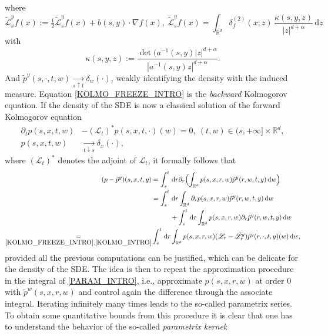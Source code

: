 \documentclass[11pt]{article}
\newcommand{\ie}{i.e.,\xspace}
\numberwithin{equation}{section}\providecommand{\asymp}{\mathrel{\sim}}
\newcommand{\rd}{\mathrm{d}}
\theoremstyle{plain}
\theoremstyle{definition}
\let\p\partial
\newcommand\cL{{\mathcal L}}
\newcommand\mR{\mathbb{R}}
\newcommand\1{{\mathbf{1}}}
\newcommand\sL{{\mathscr L}}
\newcommand{\dif}{\,\mathrm{d}}
\begin{document}
{\begin{equation}
\end{equation}
where
\[
\tilde \sL^{y}_{s} f(x):=\tfrac 12\tilde \cL^{y}_{s} f(x)+b(s, y)\cdot\nabla f(x),\
\tilde \cL^{y}_{s} f(x)=\int_{\mR^d}\delta^{(2)}_f(x;z)\,\frac{\kappa(s,y,z)}{|z|^{d+\alpha}}\,\rd z
\]
with
\[
\kappa(s,y,z):=\frac{\det(a^{-1}(s,y)|z|^{d+\alpha}}{|a^{-1}(s,y)z|^{d+\alpha}}.
\]
And $\tilde p^{y}(s,\cdot,t,w) \underset{s\uparrow t}{\longrightarrow} \delta_w(\cdot)$, weakly identifying the density with the induced measure. Equation \eqref{KOLMO_FREEZE_INTRO} is the \textit{backward} Kolmogorov equation. If the density of the SDE is now a classical solution of the forward Kolmogorov equation
\begin{equation}
\begin{aligned}\label{KOLMO_INTRO}
\p_t p(s,x,t,w)&-({\sL}_t)^*p(s,x,t,\cdot)(w)=0,\ (t,w)\in (s,+\infty]\times \mR^d,\\
p(s,x,t,w) &\underset{t\downarrow s}{\longrightarrow} \delta_x(\cdot),
\end{aligned}
\end{equation}
where $({\sL}_t)^* $ denotes the adjoint of ${\sL}_t $,
it formally follows that
\begin{equation}
\begin{aligned}
(p-\tilde p^y)(s,x,t,y)&=\int_s^t \dif r \partial_r\Bigl(\int_{\mR^d}p(s,x,r,w) \tilde p^y(r,w,t,y) \dif w\Bigr)\\
&=\int_s^t \dif r \int_{\mR^d} \partial_r p(s,x,r,w) \tilde p^y(r,w,t,y) \dif w\\
&\hspace*{1cm}+\int_s^t \dif r \int_{\mR^d} p(s,x,r,w) \partial_r\tilde p^y(r,w,t,y) \dif w\\
\underset{\eqref{KOLMO_FREEZE_INTRO}, \eqref{KOLMO_INTRO}}{=}
&\int_s^t \dif r \int_{\mR^d} p(s,x,r,w)({\sL}_r-\tilde {\sL}_r^y)\tilde p^y (r,\cdot,t,y)(w)\dif w,
\label{PARAM_INTRO}
\end{aligned}
\end{equation}
provided all the previous computations can be justified, which can be delicate for the density of the SDE. The idea is then to repeat the approximation procedure in the integral of \eqref{PARAM_INTRO}, \ie approximate $p(s,x,r,w)$ at order 0 with $\tilde p^w(s,x,r,w)$ and control again the difference through the associate integral. Iterating infinitely many times leads to the so-called parametrix series. To obtain some quantitative bounds from this procedure it is clear that one has to understand the behavior of the so-called \textit{parametrix kernel}:
\begin{align*}

\end{align*}}
\end{document}
